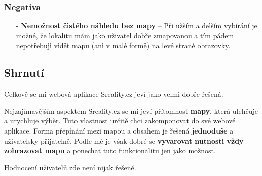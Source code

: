 \subsubsection*{Negativa}
\begin{itemize}
    \item[-] \textbf{Nemožnost čistého náhledu bez mapy} -- Při užším a delším vybírání je možné, že lokalitu mám jako uživatel dobře zmapovanou a tím pádem nepotřebuji vidět mapu (ani v malé formě) na levé straně obrazovky.
\end{itemize}



\newpage
\subsection{Shrnutí}
Celkově se mi webová aplikace Sreality.cz jeví jako velmi dobře řešená.

Nejzajímavějším aspektem Sreality.cz se mi jeví přítomnost \textbf{mapy}, která ulehčuje a urychluje výběr. Tuto vlastnost určitě chci zakomponovat do své webové aplikace. Forma přepínání mezi mapou a obsahem je řešená \textbf{jednoduše} a uživatelsky přijatelně. Podle mě je však dobré se \textbf{vyvarovat nutnosti vždy zobrazovat mapu} a ponechat tuto funkcionalitu jen jako možnost.

Hodnocení uživatelů zde není nijak řešené.